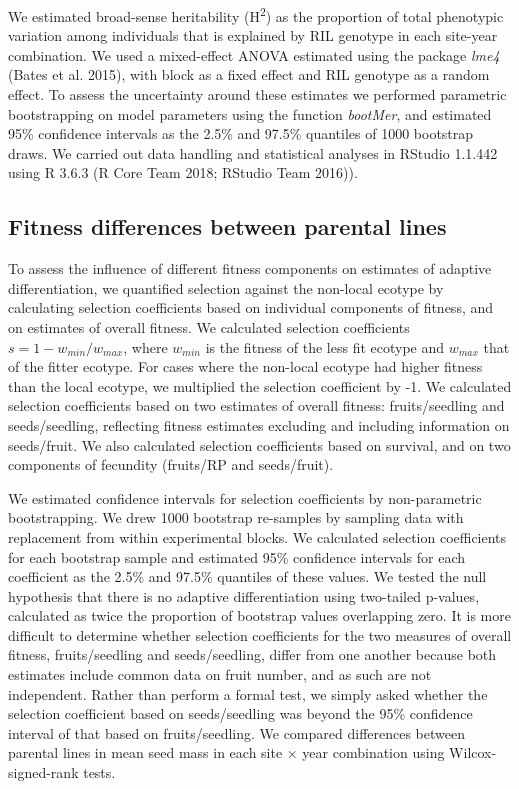 \documentclass[]{article}
\begin{document}
We estimated broad-sense heritability (H\textsuperscript{2}) as the proportion of total phenotypic variation among individuals that is explained by RIL genotype in each site-year combination. We used a mixed-effect ANOVA estimated using the package \emph{lme4} (Bates et al. 2015), with block as a fixed effect and RIL genotype as a random effect. To assess the uncertainty around these estimates we performed parametric bootstrapping on model parameters using the function \emph{bootMer}, and estimated 95\% confidence intervals as the 2.5\% and 97.5\% quantiles of 1000 bootstrap draws. We carried out data handling and statistical analyses in RStudio 1.1.442 using R 3.6.3 (R Core Team 2018; RStudio Team 2016)).

\hypertarget{fitness-differences-between-parental-lines}{%
\subsection{Fitness differences between parental lines}\label{fitness-differences-between-parental-lines}}

To assess the influence of different fitness components on estimates of adaptive differentiation, we quantified selection against the non-local ecotype by calculating selection coefficients based on individual components of fitness, and on estimates of overall fitness. We calculated selection coefficients \(s=1-w_{min}/w_{max}\), where \(w_{min}\) is the fitness of the less fit ecotype and \(w_{max}\) that of the fitter ecotype. For cases where the non-local ecotype had higher fitness than the local ecotype, we multiplied the selection coefficient by -1. We calculated selection coefficients based on two estimates of overall fitness: fruits/seedling and seeds/seedling, reflecting fitness estimates excluding and including information on seeds/fruit. We also calculated selection coefficients based on survival, and on two components of fecundity (fruits/RP and seeds/fruit).

We estimated confidence intervals for selection coefficients by non-parametric bootstrapping. We drew 1000 bootstrap re-samples by sampling data with replacement from within experimental blocks. We calculated selection coefficients for each bootstrap sample and estimated 95\% confidence intervals for each coefficient as the 2.5\% and 97.5\% quantiles of these values. We tested the null hypothesis that there is no adaptive differentiation using two-tailed p-values, calculated as twice the proportion of bootstrap values overlapping zero. It is more difficult to determine whether selection coefficients for the two measures of overall fitness, fruits/seedling and seeds/seedling, differ from one another because both estimates include common data on fruit number, and as such are not independent. Rather than perform a formal test, we simply asked whether the selection coefficient based on seeds/seedling was beyond the 95\% confidence interval of that based on fruits/seedling. We compared differences between parental lines in mean seed mass in each site × year combination using Wilcox-signed-rank tests.
\end{document}
